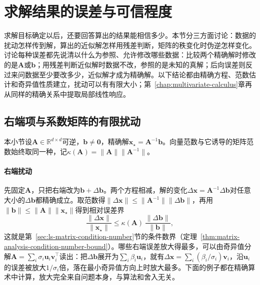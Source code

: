 \section{求解结果的误差与可信程度}
\label{sec:ls-numerical-sensitivity}

求解目标确定以后，还要回答算出的结果能相信多少。本节分三方面讨论：数据的扰动怎样传到解，算出的近似解怎样用残差判断，矩阵的秩变化时伪逆怎样变化。讨论每种误差都先说清以什么为参照、允许修改哪些数据：比较两个精确解时修改的是$\bm A$或$\bm b$；用残差判断近似解时数据不改，参照的是未知的真解；后向误差则反过来问数据至少要改多少，近似解才成为精确解。以下结论都由精确方程、范数估计和奇异值性质建立，扰动可以有有限大小；第~\ref{chap:multivariate-calculus}章再从同样的精确关系中提取局部线性响应。

\subsection{右端项与系数矩阵的有限扰动}
\label{sec:ls-equation-sensitivity}

本小节设$\bm A\in\mathbb R^{d\times d}$可逆，$\bm b\ne\bm0$，精确解$\bm x_\star=\bm A^{-1}\bm b$。向量范数与它诱导的矩阵范数始终取同一种，记$\kappa(\bm A)=\lVert\bm A\rVert\lVert\bm A^{-1}\rVert$。

\paragraph{右端扰动}
先固定$\bm A$，只把右端改为$\bm b+\Delta\bm b$。两个方程相减，解的变化$\Delta\bm x=\bm A^{-1}\Delta\bm b$对任意大小的$\Delta\bm b$都精确成立。取范数得$\lVert\Delta\bm x\rVert\leq\lVert\bm A^{-1}\rVert\lVert\Delta\bm b\rVert$，再用$\lVert\bm b\rVert\leq\lVert\bm A\rVert\lVert\bm x_\star\rVert$得到相对误差界
\[
 \frac{\lVert\Delta\bm x\rVert}{\lVert\bm x_\star\rVert}\leq\kappa(\bm A)\,\frac{\lVert\Delta\bm b\rVert}{\lVert\bm b\rVert},
\]
这就是第~\ref{sec:ls-matrix-condition-number}节的条件数界（定理~\ref{thm:matrix-analysis-condition-number-bound}）。哪些右端误差放大得最多，可以由奇异值分解$\bm A=\sum_i\sigma_i\bm u_i\bm v_i^\top$读出：把$\Delta\bm b$展开为$\sum_i\beta_i\bm u_i$，就有$\Delta\bm x=\sum_i(\beta_i/\sigma_i)\bm v_i$，沿$\bm u_i$的误差被放大$1/\sigma_i$倍，落在最小奇异值方向上时放大最多。下面的例子都在精确算术中计算，放大完全来自问题本身，与算法和舍入无关。

